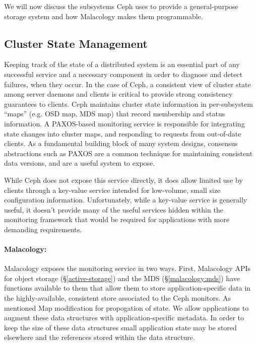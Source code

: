 \documentclass[10pt,twocolumn]{article}
\begin{document}
We will now discuss the subsystems Ceph uses to provide a general-purpose
storage system and how Malacology makes them programmable.

\subsection{Cluster State Management}
\label{consistencyversioning-of-cluster-state}

Keeping track of the state of a distributed system is an essential part of any 
successful service and a necessary component in order to diagnose and detect 
failures, when they occur. In the case of Ceph, a consistent view of cluster 
state among server daemons and clients is critical
to provide strong consistency guarantees to clients. Ceph maintains cluster
state information in per-subsystem ``maps'' (e.g. OSD map, MDS map) that
record membership and status information. A PAXOS-based monitoring service is
responsible for integrating state changes into cluster maps, and responding to
requests from out-of-date clients. As a fundamental building block of many
system designs, consensus abstractions such as PAXOS are a common technique
for maintaining consistent data versions, and are a useful system to expose.

While Ceph does not expose this service directly, it does allow limited use by
clients through a key-value service intended for low-volume, small size
configuration information. Unfortunately, while a key-value service is
generally useful, it doesn't provide many of the useful services hidden within
the monitoring framework that would be required for applications with more
demanding requirements.

\paragraph*{Malacology:} Malacology exposes the monitoring service in two ways. 
First, Malacology APIs for object storage (\S\ref{active-storage}) and the MDS 
(\S\ref{malacology:mds}) have functions available to them that allow them to 
store application-specific data in the highly-available, consistent store 
associated to the Ceph monitors. As mentioned
Map modification for propogation of state. We allow applications to augment
these data structures with application-specific metadata. In order to keep the
size of these data structures small application state may be stored elsewhere
and the references stored within the data structure.
\end{document}
